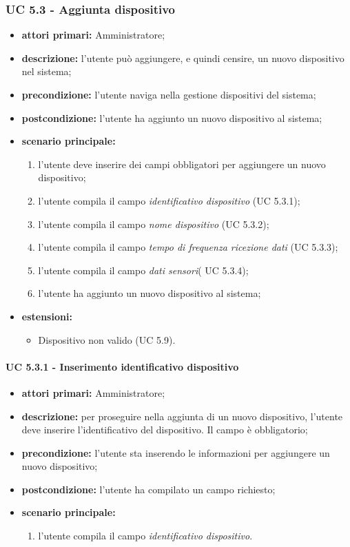 			\subsubsection{UC 5.3 - Aggiunta dispositivo}
			\begin{itemize}
				\item \textbf{attori primari:} Amministratore;
				\item \textbf{descrizione:} l'utente può aggiungere, e quindi censire, un nuovo dispositivo nel sistema;
				\item \textbf{precondizione:} l'utente naviga nella gestione dispositivi del sistema;
				\item \textbf{postcondizione:} l'utente ha aggiunto un nuovo dispositivo al sistema;
				\item \textbf{scenario principale:}
				\begin{enumerate}
					\item{l'utente deve inserire dei campi obbligatori per aggiungere un nuovo dispositivo;}
					\item{l'utente compila il campo \textit{identificativo dispositivo} (UC 5.3.1);}
					\item{l'utente compila il campo \textit{nome dispositivo} (UC 5.3.2);}
					\item{l'utente compila il campo \textit{tempo di frequenza ricezione dati} (UC 5.3.3);}
					\item{l'utente compila il campo \textit{dati sensori}( UC 5.3.4);}
					\item{l'utente ha aggiunto un nuovo dispositivo al sistema;}
				\end{enumerate}
				\item \textbf{estensioni:}
				\begin{itemize}
					\item Dispositivo non valido (UC 5.9).
				\end{itemize}
			\end{itemize}

				\paragraph{UC 5.3.1 - Inserimento identificativo dispositivo}
				\begin{itemize}
					\item \textbf{attori primari:} Amministratore;
					\item \textbf{descrizione:} per proseguire nella aggiunta di un nuovo dispositivo, l'utente deve inserire l'identificativo del dispositivo. Il campo è obbligatorio;
					\item \textbf{precondizione:} l'utente sta inserendo le informazioni per aggiungere un nuovo dispositivo;
					\item \textbf{postcondizione:} l'utente ha compilato un campo richiesto;
					\item \textbf{scenario principale:}
					\begin{enumerate}
						\item{l'utente compila il campo \textit{identificativo dispositivo}.}
					\end{enumerate}
				\end{itemize}

